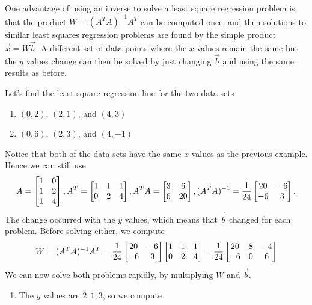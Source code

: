One advantage of using an inverse to solve a least square regression problem is that the product $W=(A^TA)^{-1}A^T$ can be computed once, and then solutions to similar least squares regression problems are found by the simple product $\vec x=W\vec b$. 
A different set of data points where the $x$ values remain the same but the $y$ values change can then be solved by just changing $\vec b$ and using the same results as before. 

\begin{example}
Let's find the least square regression line for the two data sets 
\begin{enumerate}
	\item $(0,2)$, $(2,1)$, and $(4,3)$
	\item $(0,6)$, $(2,3)$, and $(4,-1)$
\end{enumerate}
Notice that both of the data sets have the same $x$ values as the previous example.  Hence we can still use 
$$
A = \begin{bmatrix}1&0\\1&2\\1&4\end{bmatrix},
A^T= \begin{bmatrix}1&1&1\\0&2&4\end{bmatrix}, 
A^T A= \begin{bmatrix}3&6\\6&20\end{bmatrix}, 
(A^TA)^{-1}=\displaystyle\frac{1}{24}\begin{bmatrix}20&-6\\-6&3\end{bmatrix}.
$$ 
The change occurred with the $y$ values, which means that $\vec b$ changed for each problem.  Before solving either, we compute 
$$W=(A^TA)^{-1}A^T 
= \displaystyle\frac{1}{24}\begin{bmatrix}20&-6\\-6&3\end{bmatrix}\begin{bmatrix}1&1&1\\0&2&4\end{bmatrix}
= \displaystyle\frac{1}{24}\begin{bmatrix}20&8&-4\\-6&0&6\end{bmatrix}
$$
We can now solve both problems rapidly, by multiplying $W$ and $\vec b$.
\begin{enumerate}
	\item The $y$ values are $2,1,3$, so we compute

\end{enumerate}
\end{example}
